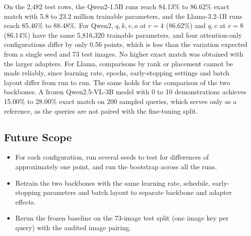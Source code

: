 \documentclass[conference]{IEEEtran}
\begin{document}
On the 2,482 test rows, the Qwen2-1.5B runs reach 84.13\% to 86.62\% exact match with 5.8 to 23.2 million trainable parameters, and the Llama-3.2-1B runs reach 85.46\% to 88.48\%. For Qwen2, $q,k,v,o$ at $r=4$ (86.62\%) and $q,v$ at $r=8$ (86.14\%) have the same 5,816,320 trainable parameters, and four attention-only configurations differ by only 0.56 points, which is less than the variation expected from a single seed and 73 test images. No higher exact match was obtained with the larger adapters. For Llama, comparisons by rank or placement cannot be made reliably, since learning rate, epochs, early-stopping settings and batch layout differ from run to run. The same holds for the comparison of the two backbones. A frozen Qwen2.5-VL-3B model with 0 to 10 demonstrations achieves 15.00\% to 28.00\% exact match on 200 sampled queries, which serves only as a reference, as the queries are not paired with the fine-tuning split.

\subsection{Future Scope}

\begin{itemize}[leftmargin=*, itemsep=1pt, topsep=2pt, parsep=0pt]
  \item For each configuration, run several seeds to test for differences of approximately one point, and run the bootstrap across all the runs.
  \item Retrain the two backbones with the same learning rate, schedule, early-stopping parameters and batch layout to separate backbone and adapter effects.
  \item Rerun the frozen baseline on the 73-image test split (one image key per query) with the audited image pairing.
\end{itemize}
\end{document}
